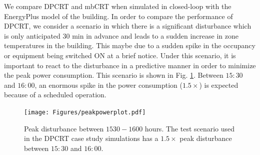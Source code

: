 We compare DPCRT and mbCRT when simulated in closed-loop with the EnergyPlus model of the building. In order to compare the performance of DPCRT, we consider a scenario in which there is a significant disturbance which is only anticipated $30$ min in advance and leads to a sudden increase in zone temperatures in the building. This maybe due to a sudden spike in the occupancy or equipment being switched ON at a brief notice. Under this scenario, it is important to react to the disturbance in a predictive manner in order to minimize the peak power consumption. This scenario is shown in Fig. \ref{F:scenario}. Between $15{:}30$ and $16{:}00$, an enormous spike in the power consumption ($1.5\times$) is expected because of a scheduled operation.
\begin{figure}
	\centering
	\hspace{1pt}
	\texttt{[image: Figures/peakpowerplot.pdf]}
	\centering
	\caption{Peak disturbance between $1530-1600$ hours. The test scenario used in the DPCRT case study simulations has a $1.5\times$ peak disturbance between $15{:}30$ and $16{:}00$.}
	\label{F:scenario}
	\vspace{-10pt}
\end{figure}
